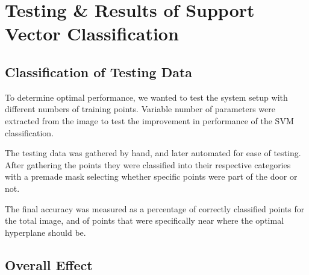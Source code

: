 \chapter {Testing \& Results of Support Vector Classification}

\section{Classification of Testing Data}
To determine optimal performance, we wanted to test the system setup with different numbers of training points. Variable number of parameters were extracted from the image to test the improvement in performance of the SVM classification.

The testing data was gathered by hand, and later automated for ease of testing. After gathering the points they were classified into their respective categories with a premade mask selecting whether specific points were part of the door or not.

The final accuracy was measured as a percentage of correctly classified points for the total image, and of points that were specifically near where the optimal hyperplane should be.
\section{Overall Effect}
 
